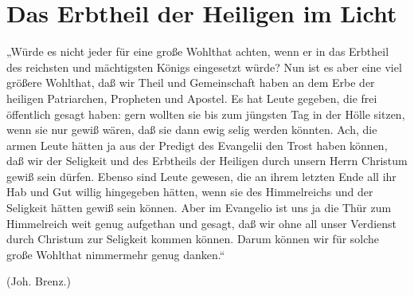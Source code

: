 \chapter{Das Erbtheil der Heiligen im Licht}

„Würde es nicht jeder für eine große Wohlthat achten, wenn er in das Erbtheil des reichsten und mächtigsten Königs eingesetzt würde? Nun ist es aber eine viel größere Wohlthat, daß wir Theil und Gemeinschaft haben an dem Erbe der heiligen Patriarchen, Propheten und Apostel. Es hat Leute gegeben, die frei öffentlich gesagt haben: gern wollten sie bis zum jüngsten Tag in der Hölle sitzen, wenn sie nur gewiß wären, daß sie dann ewig selig werden könnten. Ach, die armen Leute hätten ja aus der Predigt des Evangelii den Trost haben können, daß wir der Seligkeit und des Erbtheils der Heiligen durch unsern Herrn Christum gewiß sein dürfen. Ebenso sind Leute gewesen, die an ihrem letzten Ende all ihr Hab und Gut willig hingegeben hätten, wenn sie des Himmelreichs und der Seligkeit hätten gewiß sein können. Aber im Evangelio ist uns ja die Thür zum Himmelreich weit genug aufgethan und gesagt, daß wir ohne all unser Verdienst durch Christum zur Seligkeit kommen können. Darum können wir für solche große Wohlthat nimmermehr genug danken.“

(Joh. Brenz.)
